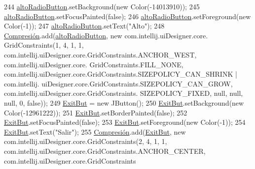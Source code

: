 \begin{DoxyCode}
244         \hyperlink{classpresentacion_1_1form_1_1PopUp__Comp_a9f49f4c6ce6d4f60a7015d8699aef151}{altoRadioButton}.setBackground(\textcolor{keyword}{new} Color(-14013910));
245         \hyperlink{classpresentacion_1_1form_1_1PopUp__Comp_a9f49f4c6ce6d4f60a7015d8699aef151}{altoRadioButton}.setFocusPainted(\textcolor{keyword}{false});
246         \hyperlink{classpresentacion_1_1form_1_1PopUp__Comp_a9f49f4c6ce6d4f60a7015d8699aef151}{altoRadioButton}.setForeground(\textcolor{keyword}{new} Color(-1));
247         \hyperlink{classpresentacion_1_1form_1_1PopUp__Comp_a9f49f4c6ce6d4f60a7015d8699aef151}{altoRadioButton}.setText(\textcolor{stringliteral}{"Alto"});
248         \hyperlink{classpresentacion_1_1form_1_1PopUp__Comp_a5769b499f21466bae765c41428512966}{Compresión}.add(\hyperlink{classpresentacion_1_1form_1_1PopUp__Comp_a9f49f4c6ce6d4f60a7015d8699aef151}{altoRadioButton}, \textcolor{keyword}{new} com.intellij.uiDesigner.core.
      GridConstraints(1, 4, 1, 1, com.intellij.uiDesigner.core.GridConstraints.ANCHOR\_WEST, com.intellij.uiDesigner.core.
      GridConstraints.FILL\_NONE, com.intellij.uiDesigner.core.GridConstraints.SIZEPOLICY\_CAN\_SHRINK | com.intellij.
      uiDesigner.core.GridConstraints.SIZEPOLICY\_CAN\_GROW, com.intellij.uiDesigner.core.GridConstraints.
      SIZEPOLICY\_FIXED, null, null, null, 0, \textcolor{keyword}{false}));
249         \hyperlink{classpresentacion_1_1form_1_1PopUp__Comp_aad0de868daa06f82567784941064f12d}{ExitBut} = \textcolor{keyword}{new} JButton();
250         \hyperlink{classpresentacion_1_1form_1_1PopUp__Comp_aad0de868daa06f82567784941064f12d}{ExitBut}.setBackground(\textcolor{keyword}{new} Color(-12961222));
251         \hyperlink{classpresentacion_1_1form_1_1PopUp__Comp_aad0de868daa06f82567784941064f12d}{ExitBut}.setBorderPainted(\textcolor{keyword}{false});
252         \hyperlink{classpresentacion_1_1form_1_1PopUp__Comp_aad0de868daa06f82567784941064f12d}{ExitBut}.setFocusPainted(\textcolor{keyword}{false});
253         \hyperlink{classpresentacion_1_1form_1_1PopUp__Comp_aad0de868daa06f82567784941064f12d}{ExitBut}.setForeground(\textcolor{keyword}{new} Color(-1));
254         \hyperlink{classpresentacion_1_1form_1_1PopUp__Comp_aad0de868daa06f82567784941064f12d}{ExitBut}.setText(\textcolor{stringliteral}{"Salir"});
255         \hyperlink{classpresentacion_1_1form_1_1PopUp__Comp_a5769b499f21466bae765c41428512966}{Compresión}.add(\hyperlink{classpresentacion_1_1form_1_1PopUp__Comp_aad0de868daa06f82567784941064f12d}{ExitBut}, \textcolor{keyword}{new} com.intellij.uiDesigner.core.GridConstraints(2, 4, 1,
       1, com.intellij.uiDesigner.core.GridConstraints.ANCHOR\_CENTER, com.intellij.uiDesigner.core.GridConstraints

\end{DoxyCode}
